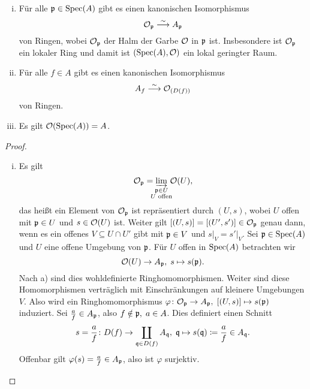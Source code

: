 \begin{prop}
	\begin{enumerate}[i)]
		\item Für alle $\mathfrak{p} \in \operatorname{Spec}(A)$ gibt es einen kanonischen Isomorphismus
		\[
			\mathcal{O}_{\mathfrak{p}} \overset{\sim}{\longrightarrow} A_{\mathfrak{p}}
		\]
		von Ringen, wobei $\mathcal{O}_{\mathfrak{p}}$ der Halm der Garbe $\mathcal{O}$ in $\mathfrak{p}$ ist. Insbesondere ist $\mathcal{O}_{\mathfrak{p}}$ ein lokaler Ring und damit ist $(\operatorname{Spec}(A),\mathcal{O})$ ein lokal geringter Raum.
		\item Für alle $f \in A$ gibt es einen kanonischen Isomorphismus
		\[
			A_f \overset{\sim}{\longrightarrow}\mathcal{O}_{(D(f))}
		\]
		von Ringen.
		\item Es gilt $\mathcal{O}(\operatorname{Spec}(A)) = A$.
	\end{enumerate}
	\begin{proof}
		\begin{enumerate}[i)]
			\item Es gilt
			\[
				\mco_\mfp = \varinjlim_{\substackclap{\mfp \in U\\U \text{ offen}}} \, \mco(U),
			\]
			das heißt ein Element von $\mathcal{O}_{\mathfrak{p}}$ ist repräsentiert durch $(U,s)$, wobei $U$ offen mit $\mathfrak{p} \in U$ und $s \in \mathcal{O}(U)$ ist. Weiter gilt $[(U,s)] = [(U',s')] \in \mathcal{O}_{\mathfrak{p}}$ genau dann, wenn es ein offenes $V \subseteq U \cap U'$ gibt mit $\mathfrak{p} \in V$ und $s\vert_V = s'\vert_V$. Sei $\mathfrak{p} \in \operatorname{Spec}(A)$ und $U$ eine offene Umgebung von $\mathfrak{p}$. Für $U$ offen in $\operatorname{Spec}(A)$ betrachten wir
			\[
			 	\mathcal{O}(U) \to A_{\mathfrak{p}},\; s \mapsto s(\mathfrak{p}).
			\]
			Nach a) sind dies wohldefinierte Ringhomomorphismen. Weiter sind diese Homomorphismen verträglich mit Einschränkungen auf kleinere Umgebungen $V$. Also wird ein Ringhomomorphismus $\varphi\colon\mathcal{O}_{\mathfrak{p}} \to A_{\mathfrak{p}},\; [(U,s)] \mapsto s(\mathfrak{p})$ induziert.
			Sei $\frac{a}{f}\in A_{\mathfrak{p}}$, also $f \notin \mathfrak{p},\; a \in A$. Dies definiert einen Schnitt
			\[
				s = \frac{a}{f}\colon D(f) \to \coprod_{\mathfrak{q} \in D(f)} A_{\mathfrak{q}},\; \mathfrak{q} \mapsto s(\mathfrak{q}) \coloneqq \frac{a}{f} \in A_{\mathfrak{q}}.
			\]
			Offenbar gilt $\varphi(s) = \frac{a}{f}\in A_{\mathfrak{p}}$, also ist $\varphi$ surjektiv.


\end{enumerate}
\end{proof}
\end{prop}
